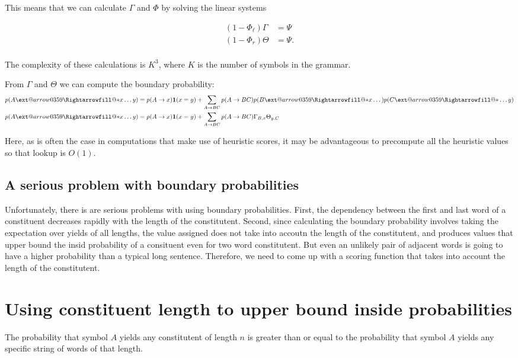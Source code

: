 \documentclass{article}
\makeatletter
\newcommand{\xRightarrow}[2][]{\ext@arrow 0359\Rightarrowfill@{#1}{#2}}
\newcommand{\derives}{\xRightarrow{*}}
\makeatother
\begin{document}
This means that we can calculate $\Gamma$ and $\Phi$ by solving the linear systems 

\begin{align}
  (1-\Phi_\ell) \Gamma &= \Psi\\
  (1-\Phi_r) \Theta &= \Psi.\\
\end{align}

The complexity of these calculations is $K^3$, where $K$ is the number
of symbols in the grammar. 

From $\Gamma$ and $\Theta$ we can compute the boundary probability: 
\begin{align}
  p(A \derives x \dots y) &= p(A \rightarrow x) \mathbf{1}(x = y) 
     + \sum_{A \rightarrow B C} p(A \rightarrow B C) p(B \derives x \dots) p(C \derives \dots y)\\
  p(A \derives x \dots y) &= p(A \rightarrow x) \mathbf{1}(x = y) 
     + \sum_{A \rightarrow B C} p(A \rightarrow B C) \Gamma_{B, x} \Theta_{y, C}
\end{align}

Here, as is often the case in computations that make use of heuristic
scores, it may be advantageous to precompute all the heuristic values
so that lookup is $O(1)$. 

\subsection{A serious problem with boundary probabilities}
Unfortunately, there is are serious problems with using boundary
probabilities. First, the dependency between the first and last word
of a constituent decreases rapidly with the length of the
constitutent. Second, since calculating the boundary probability
involves taking the expectation over yields of all lengths, the value
assigned does not take into accoutn the length of the constitutent,
and produces values that upper bound the insid probability of a
consituent even for two word constitutent. But even an unlikely pair
of adjacent words is going to have a higher probability than a typical
long sentence. Therefore, we need to come up with a scoring function
that takes into account the length of the constitutent.

\section{Using constituent length to upper bound inside probabilities}
The probability that symbol $A$ yields any constitutent of length $n$
is greater than or equal to the probability that symbol $A$ yields any
specific string of words of that length. 
\end{document}
